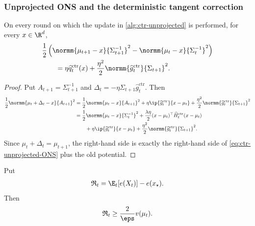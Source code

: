 \subsubsection{Unprojected ONS and the deterministic tangent correction}

\begin{lemma}
    \label{lem:ctr-unprojected-ONS}
    On every round on which the update in \cref{alg:ctr-unprojected} is
    performed, for every $x\in\R^d$,
    \begin{align}
         & \frac12\left(
        \normm{\mu_{t+1}-x}{\Sigma_{t+1}^{-1}}^2
        -\normm{\mu_t-x}{\Sigma_t^{-1}}^2
        \right)
        \nonumber        \\
         & \qquad=
        \eta\widehat q_t^{\mathrm{ctr}}(x)
        +\frac{\eta^2}{2}
        \normm{\widehat g_t^{\mathrm{ctr}}}{\Sigma_{t+1}}^2.
        \label{eq:ctr-unprojected-ONS}
    \end{align}
\end{lemma}

\begin{proof}
    Put $A_{t+1}=\Sigma_{t+1}^{-1}$ and
    $\Delta_t=-\eta\Sigma_{t+1}\widehat g_t^{\mathrm{ctr}}$.  Then
    \begin{align}
        \frac12\normm{\mu_t+\Delta_t-x}{A_{t+1}}^2
         & =\frac12\normm{\mu_t-x}{A_{t+1}}^2
        +\eta\ip{\widehat g_t^{\mathrm{ctr}}}{x-\mu_t}
        +\frac{\eta^2}{2}
        \normm{\widehat g_t^{\mathrm{ctr}}}{\Sigma_{t+1}}^2
        \\
         & =\frac12\normm{\mu_t-x}{\Sigma_t^{-1}}^2
        +\frac{\lambda\eta}{2}
        (x-\mu_t)^\top\widehat H_t^{\mathrm{ctr}}(x-\mu_t)
        \\
         & \qquad
        +\eta\ip{\widehat g_t^{\mathrm{ctr}}}{x-\mu_t}
        +\frac{\eta^2}{2}
        \normm{\widehat g_t^{\mathrm{ctr}}}{\Sigma_{t+1}}^2.
    \end{align}
    Since $\mu_t+\Delta_t=\mu_{t+1}$, the right-hand side is exactly the
    right-hand side of \eqref{eq:ctr-unprojected-ONS} plus the old potential.
\end{proof}

\begin{lemma}
    \label{lem:ctr-radial-coercivity}
    Put
    \begin{align}
        \mathfrak R_t=\E_t[e(X_t)]-e(x_\star).
    \end{align}
    Then
    \begin{align}
        \mathfrak R_t\geq\frac2\eps v(\mu_t).
        \label{eq:ctr-radial-coercivity}
    \end{align}
\end{lemma}

